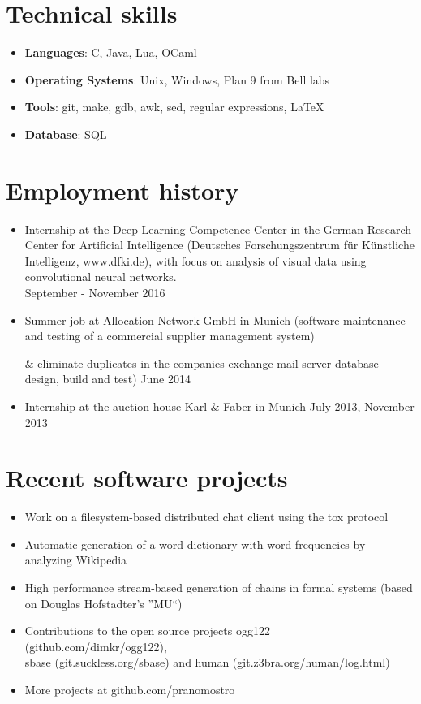 \documentclass[11pt,a4paper]{article}
\begin{document}
\section*{Technical skills}
\begin{itemize}
	\setlength{\itemsep}{1pt}
	\item[]{\bf Languages}: C, Java, Lua, OCaml
	\item[]{\bf Operating Systems}: Unix, Windows, Plan 9 from Bell labs
	\item[]{\bf Tools}: git, make, gdb, awk, sed, regular expressions, LaTeX
	\item[]{\bf Database}: SQL
\end{itemize}

\section*{Employment history}
\begin{itemize}
	\setlength{\itemsep}{1pt}
	\item Internship at the Deep Learning Competence Center in the German Research Center for Artificial Intelligence
	(Deutsches Forschungszentrum für Künstliche Intelligenz, www.dfki.de), with focus on analysis of
	visual data using convolutional neural networks.\\
	\hfill September - November 2016
	\item Summer job at Allocation Network GmbH in Munich (software maintenance and testing of a commercial supplier management system)

	\& eliminate duplicates in the companies exchange mail
	server database - design, build and test)
	\hfill June 2014
	\item Internship at the auction house Karl \& Faber in Munich \hfill July 2013, November 2013
\end{itemize}

\section*{Recent software projects}
\begin{itemize}
	\setlength{\itemsep}{1pt}
	\item Work on a filesystem-based distributed chat client using the tox protocol
	\item Automatic generation of a word dictionary with word
	frequencies by analyzing Wikipedia
	\item High performance stream-based generation of chains
	in formal systems (based on Douglas Hofstadter's ''MU``)
	\item Contributions to the open source projects ogg122 (github.com/dimkr/ogg122),\\
	sbase (git.suckless.org/sbase) and human (git.z3bra.org/human/log.html)
	\item More projects at github.com/pranomostro
\end{itemize}
\end{document}
